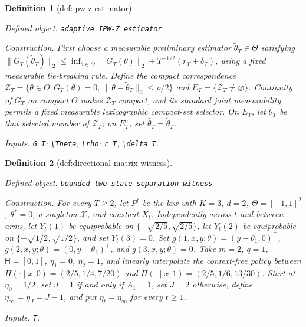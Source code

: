 \documentclass{article}
\newtheorem{definition}{Definition}
\begin{document}
\begin{definition}[def:ipw-z-estimator]\label{def:ipw-z-estimator}
\par\smallskip\noindent\emph{Defined object.} \texttt{adaptive IPW-\allowbreak{}Z estimator}
\par\smallskip\noindent\emph{Construction.} First choose a measurable preliminary estimator \(\widetilde\theta_T\in\Theta\) satisfying \(\|G_T(\widetilde\theta_T)\|_2\le\inf_{\theta\in\Theta}\|G_T(\theta)\|_2+T^{-1/2}(r_T+\delta_T)\), using a fixed measurable tie-breaking rule. Define the compact correspondence \(\mathcal Z_T=\{\theta\in\Theta:G_T(\theta)=0,\ \|\theta-\widetilde\theta_T\|_2\le\rho/2\}\) and \(E_T=\{\mathcal Z_T\ne\varnothing\}\). Continuity of \(G_T\) on compact \(\Theta\) makes \(\mathcal Z_T\) compact, and its standard joint measurability permits a fixed measurable lexicographic compact-set selector. On \(E_T\), let \(\widehat\theta_T\) be that selected member of \(\mathcal Z_T\); on \(E_T^c\), set \(\widehat\theta_T=\widetilde\theta_T\).
\par\smallskip\noindent\emph{Inputs.} \texttt{G\_\allowbreak{}T}; \texttt{\textbackslash{}\allowbreak{}Theta}; \texttt{\textbackslash{}\allowbreak{}rho}; \texttt{r\_\allowbreak{}T}; \texttt{\textbackslash{}\allowbreak{}delta\_\allowbreak{}T}.
\end{definition}

\begin{definition}[def:directional-matrix-witness]\label{def:directional-matrix-witness}
\par\smallskip\noindent\emph{Defined object.} \texttt{bounded two-\allowbreak{}state separation witness}
\par\smallskip\noindent\emph{Construction.} For every \(T\ge2\), let \(P^{\dagger}\) be the law with \(K=3\), \(d=2\), \(\Theta=[-1,1]^2\), \(\theta^*=0\), a singleton \(\mathcal X\), and constant \(X_t\). Independently across \(t\) and between arms, let \(Y_t(1)\) be equiprobable on \(\{-\sqrt{2/5},\sqrt{2/5}\}\), let \(Y_t(2)\) be equiprobable on \(\{-\sqrt{1/2},\sqrt{1/2}\}\), and set \(Y_t(3)=0\). Set \(g(1,x,y;\theta)=(y-\theta_1,0)^\top\), \(g(2,x,y;\theta)=(0,y-\theta_2)^\top\), and \(g(3,x,y;\theta)=0\). Take \(m=2\), \(q=1\), \(\mathsf H=[0,1]\), \(\bar\eta_1=0\), \(\bar\eta_2=1\), and linearly interpolate the context-free policy between \(\Pi(\cdot\mid x,0)=(2/5,1/4,7/20)\) and \(\Pi(\cdot\mid x,1)=(2/5,1/6,13/30)\). Start at \(\eta_0=1/2\), set \(J=1\) if and only if \(A_1=1\), set \(J=2\) otherwise, define \(\eta_\infty=\bar\eta_J=J-1\), and put \(\eta_t=\eta_\infty\) for every \(t\ge1\).
\par\smallskip\noindent\emph{Inputs.} \texttt{T}.
\end{definition}
\end{document}
